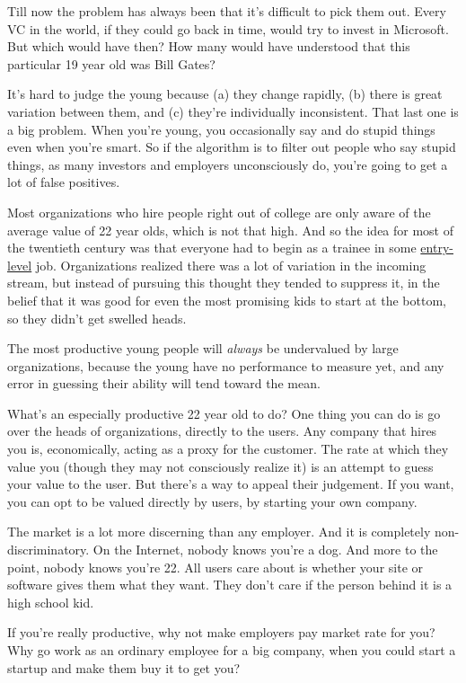 Till now the problem has always been that it's difficult to pick them
out. Every VC in the world, if they could go back in time, would try to
invest in Microsoft. But which would have then? How many would have
understood that this particular 19 year old was Bill Gates?

It's hard to judge the young because (a) they change rapidly, (b) there
is great variation between them, and (c) they're individually
inconsistent. That last one is a big problem. When you're young, you
occasionally say and do stupid things even when you're smart. So if the
algorithm is to filter out people who say stupid things, as many
investors and employers unconsciously do, you're going to get a lot of
false positives.

Most organizations who hire people right out of college are only aware
of the average value of 22 year olds, which is not that high. And so the
idea for most of the twentieth century was that everyone had to begin as
a trainee in some
\href{http://slashdot.org/comments.pl?sid=158756&cid=13299057}{entry-level}
job. Organizations realized there was a lot of variation in the incoming
stream, but instead of pursuing this thought they tended to suppress it,
in the belief that it was good for even the most promising kids to start
at the bottom, so they didn't get swelled heads.

The most productive young people will \emph{always} be undervalued by
large organizations, because the young have no performance to measure
yet, and any error in guessing their ability will tend toward the mean.

What's an especially productive 22 year old to do? One thing you can do
is go over the heads of organizations, directly to the users. Any
company that hires you is, economically, acting as a proxy for the
customer. The rate at which they value you (though they may not
consciously realize it) is an attempt to guess your value to the user.
But there's a way to appeal their judgement. If you want, you can opt to
be valued directly by users, by starting your own company.

The market is a lot more discerning than any employer. And it is
completely non-discriminatory. On the Internet, nobody knows you're a
dog. And more to the point, nobody knows you're 22. All users care about
is whether your site or software gives them what they want. They don't
care if the person behind it is a high school kid.

If you're really productive, why not make employers pay market rate for
you? Why go work as an ordinary employee for a big company, when you
could start a startup and make them buy it to get you?

